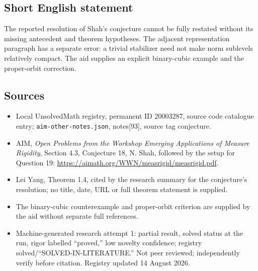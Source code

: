 \documentclass[11pt]{article}
\begin{document}
\subsection{Short English statement}
The reported resolution of Shah’s conjecture cannot be fully restated without its missing antecedent and theorem hypotheses. The adjacent representation paragraph has a separate error: a trivial stabilizer need not make norm sublevels relatively compact. The aid supplies an explicit binary-cubic example and the proper-orbit correction.
\subsection{Sources}
\begin{itemize}
\item Local UnsolvedMath registry, permanent ID 20003287, source code catalogue entry; \texttt{aim-other-notes.json}, notes[93], source tag conjecture.
\item AIM, \emph{Open Problems from the Workshop Emerging Applications of Measure Rigidity}, Section 4.3, Conjecture 18, N. Shah, followed by the setup for Question 19: \url{https://aimath.org/WWN/measrigid/measrigid.pdf}.
\item Lei Yang, Theorem 1.4, cited by the research summary for the conjecture's resolution; no title, date, URL or full theorem statement is supplied.
\item The binary-cubic counterexample and proper-orbit criterion are supplied by the aid without separate full references.
\item Machine-generated research attempt 1: partial result, solved status at the run, rigor labelled ``proved,'' low novelty confidence; registry solved/``SOLVED-IN-LITERATURE.'' Not peer reviewed; independently verify before citation. Registry updated 14 August 2026.
\end{itemize}
\end{document}

